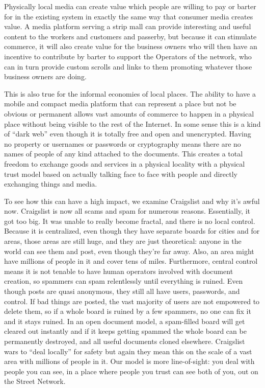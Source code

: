 Physically local media can create value which people are willing to pay or barter for in the existing system in exactly the same way that consumer media creates value.  A media platform serving a strip mall can provide interesting and useful content to the workers and customers and passerby, but because it can stimulate commerce, it will also create value for the business owners who will then have an incentive to contribute by barter to support the Operators of the network, who can in turn provide custom scrolls and links to them promoting whatever those business owners are doing.  

This is also true for the informal economies of local places.  The ability to have a mobile and compact media platform that can represent a place but not be obvious or permanent allows vast amounts of commerce to happen in a physical place without being visible to the rest of the Internet.  In some sense this is a kind of ``dark web'' even though it is totally free and open and unencrypted.   Having no property or usernames or passwords or cryptography means there are no names of people of any kind attached to the documents.  This creates a total freedom to exchange goods and services in a physical locality with a physical trust model based on actually talking face to face with people and directly exchanging things and media.  

To see how this can have a high impact, we examine Craigslist and why it's awful now.   Craigslist is now all scams and spam for numerous reasons.  Essentially, it got too big.  It was unable to really become fractal, and there is no local control.  Because it is centralized, even though they have separate boards for cities and for areas, those areas are still huge, and they are just theoretical: anyone in the world can see them and post, even though they're far away.  Also, an area might have millions of people in it and cover tens of miles.  Furthermore, central control means it is not tenable to have human operators involved with document creation, so spammers can spam relentlessly until everything is ruined.  Even though posts are quasi anonymous, they still all have users, passwords, and control.  If bad things are posted, the vast majority of users are not empowered to delete them, so if a whole board is ruined by a few spammers, no one can fix it and it stays ruined.  In an open document model, a spam-filled board will get cleared out instantly and if it keeps getting spammed the whole board can be permanently destroyed, and all useful documents cloned elsewhere.  Craigslist wars to ``deal locally'' for safety but again they mean this on the scale of a vast area with millions of people in it.  Our model is more line-of-sight: you deal with people you can see, in a place where people you trust can see both of you, out on the Street Network.

